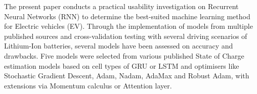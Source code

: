 %
{
The present paper conducts a practical usability investigation on Recurrent Neural Networks (RNN) to determine the best-suited machine learning method for Electric vehicles (EV).
Through the implementation of models from multiple published sources and cross-validation testing with several driving scenarios of Lithium-Ion batteries, several models have been assessed on accuracy and drawbacks.%
Five models were selected from various published State of Charge estimation models based on cell types of GRU or LSTM and optimisers like Stochastic Gradient Descent, Adam, Nadam, AdaMax and Robust Adam, with extensions via Momentum calculus or Attention layer.
}
